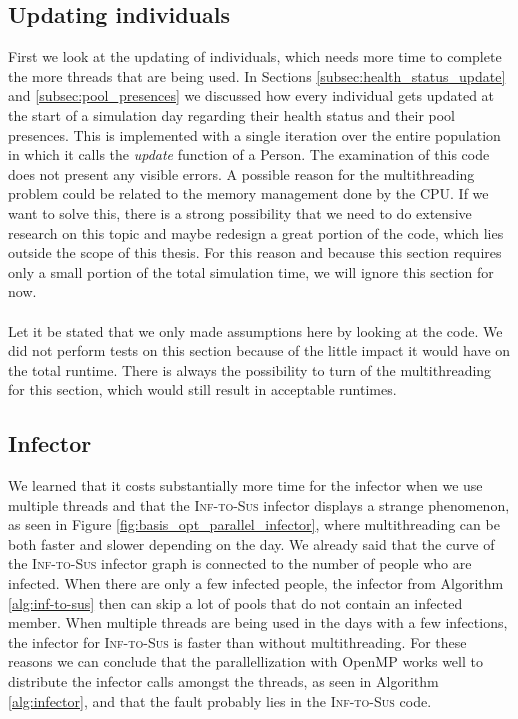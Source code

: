 \subsection{Updating individuals}
\label{subsec:first_opt_updating_individuals}
First we look at the updating of individuals, which needs more time to complete the more threads that are being used. In Sections \ref{subsec:health_status_update} and \ref{subsec:pool_presences} we discussed how every individual gets updated at the start of a simulation day regarding their health status and their pool presences. This is implemented with a single iteration over the entire population in which it calls the \textit{update} function of a Person. The examination of this code does not present any visible errors. A possible reason for the multithreading problem could be related to the memory management done by the CPU. If we want to solve this, there is a strong possibility that we need to do extensive research on this topic and maybe redesign a great portion of the code, which lies outside the scope of this thesis. For this reason and because this section requires only a small portion of the total simulation time, we will ignore this section for now.
\\\\
Let it be stated that we only made assumptions here by looking at the code. We did not perform tests on this section because of the little impact it would have on the total runtime. There is always the possibility to turn of the multithreading for this section, which would still result in acceptable runtimes.

\subsection{Infector}
\label{subsec:first_opt_infector}
We learned that it costs substantially more time for the infector when we use multiple threads and that the \textsc{Inf-to-Sus} infector displays a strange phenomenon, as seen in Figure \ref{fig:basis_opt_parallel_infector}, where multithreading can be both faster and slower depending on the day. We already said that the curve of the \textsc{Inf-to-Sus} infector graph is connected to the number of people who are infected. When there are only a few infected people, the infector from Algorithm \ref{alg:inf-to-sus} then can skip a lot of pools that do not contain an infected member. When multiple threads are being used in the days with a few infections, the infector for \textsc{Inf-to-Sus} is faster than without multithreading. For these reasons we can conclude that the parallellization with OpenMP works well to distribute the infector calls amongst the threads, as seen in Algorithm \ref{alg:infector}, and that the fault probably lies in the \textsc{Inf-to-Sus} code.

